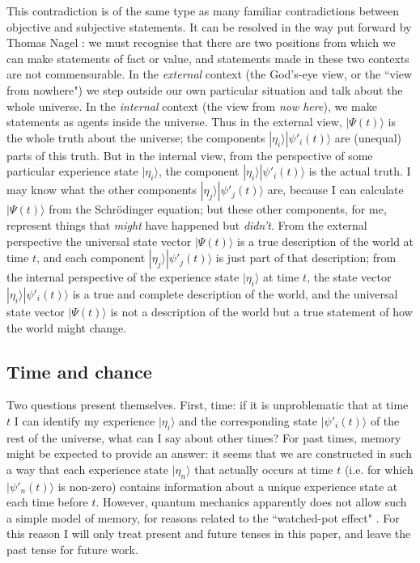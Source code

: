 \documentclass[12pt,a4paper,reqno]{article}
\renewcommand{\(}{\left(}
\renewcommand{\)}{\right)}
\newcommand{\<}{\langle}
\renewcommand{\>}{\rangle}
\theoremstyle{plain} %
\begin{document}
This contradiction is of the same type as many familiar contradictions between objective and subjective statements. It can be resolved in the way put forward by Thomas Nagel \cite{Nagel:subjobj,Nagel:nowhere}: we must recognise that there are two positions from which we can make statements of fact or value, and statements made in these two contexts are not commensurable. In the \emph{external} context (the God's-eye view, or the ``view from nowhere") we step outside our own particular situation and talk about the whole universe. In the \emph{internal} context (the view from \emph{now here}), we make statements as agents inside the universe. Thus in the external view, $|\Psi(t)\>$ is the whole truth about the universe; the components $|\eta_i\>|\psi'_i(t)\>$ are (unequal) parts of this truth. But in the internal view, from the perspective of some particular experience state $|\eta_i\>$, the component $|\eta_i\>|\psi'_i(t)\>$ is the actual truth. I may know what the other components $|\eta_j\>|\psi'_j(t)\>$ are, because I can calculate $|\Psi(t)\>$ from the Schr\"odinger equation; but these other components, for me, represent things that \emph{might} have happened but \emph{didn't}. From the external perspective the universal state vector $|\Psi(t)\>$ is a true description of the world at time $t$, and each component $|\eta_j\>|\psi'_j(t)\>$ is just part of that description; from the internal perspective of the experience state $|\eta_i\>$ at time $t$, the state vector $|\eta_i\>|\psi'_i(t)\>$ is a true and complete description of the world, and the universal state vector $|\Psi(t)\>$ is not a description of the world but a true statement of how the world might change.

\subsection{Time and chance}
\label{subsec:tchance}

Two questions present themselves. First, time: if it is unproblematic that at time $t$ I can identify my experience $|\eta_i\>$ and the corresponding state $|\psi'_i(t)\>$ of the rest of the universe, what can I say about other times? For past times, memory might be expected to provide an answer: it seems that we are constructed in such a way that each experience state $|\eta_n\>$ that actually occurs at time $t$ (i.e. for which $|\psi'_n(t)\>$ is non-zero) contains information about a unique experience state at each time before $t$. However, quantum mechanics apparently does not allow such a simple model of memory, for reasons related to the ``watched-pot effect" \cite{MisraSuda, obsdecay}. For this reason I will only treat present and future tenses in this paper, and leave the past tense for future work.
\end{document}
